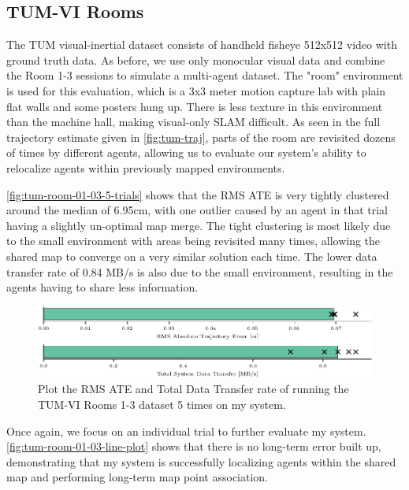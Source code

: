 \subsection{TUM-VI Rooms}
\label{sec:tum-rooms}
The TUM visual-inertial dataset \autocite{8593419} consists of handheld fisheye 512x512 video with ground truth data. As before, we use only monocular visual data and combine the Room 1-3 sessions to simulate a multi-agent dataset. The "room" environment is used for this evaluation, which is a 3x3 meter motion capture lab with plain flat walls and some posters hung up. There is less texture in this environment than the machine hall, making visual-only SLAM difficult. As seen in the full trajectory estimate given in \autoref{fig:tum-traj}, parts of the room are revisited dozens of times by different agents, allowing us to evaluate our system's ability to relocalize agents within previously mapped environments.

\autoref{fig:tum-room-01-03-5-trials} shows that the RMS ATE is very tightly clustered around the median of 6.95cm, with one outlier caused by an agent in that trial having a slightly un-optimal map merge. The tight clustering is most likely due to the small environment with areas being revisited many times, allowing the shared map to converge on a very similar solution each time. The lower data transfer rate of 0.84 MB/s is also due to the small environment, resulting in the agents having to share less information.

\begin{figure}[h]
    \centering
    \includegraphics[width=0.8\linewidth]{figures/comparison_apr11_tum_room_trajectory_a.pdf}

    \caption{Plot the RMS ATE and Total Data Transfer rate of running the TUM-VI Rooms 1-3 dataset 5 times on my system.}
    \label{fig:tum-room-01-03-5-trials}
\end{figure}

Once again, we focus on an individual trial to further evaluate my system. \autoref{fig:tum-room-01-03-line-plot} shows that there is no long-term error built up, demonstrating that my system is successfully localizing agents within the shared map and performing long-term map point association.

